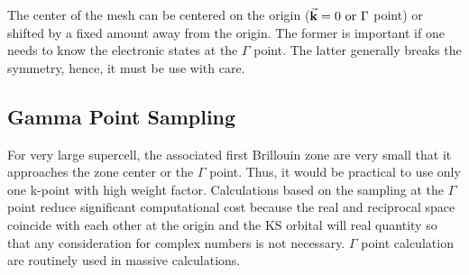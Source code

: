 The center of the mesh can be centered on the origin ($\va{k} = 0  \text{ or } \Gamma$ point) or shifted by a fixed amount away from the origin. The former is important if one needs to know the electronic states at the $\Gamma$ point. The latter generally breaks the symmetry, hence, it must be use with care. 



\subsection{Gamma Point Sampling}
For very large supercell, the associated first Brillouin zone are very small that it approaches the zone center or the $\Gamma$ point. Thus, it would be practical to use only one k-point  with high weight factor. Calculations based on the sampling at the $\Gamma$ point reduce significant computational cost because the real and reciprocal space coincide with each  other at the origin and the KS orbital will real quantity so that any consideration for complex numbers is not necessary. $\Gamma$ point calculation are routinely used in massive calculations. 

